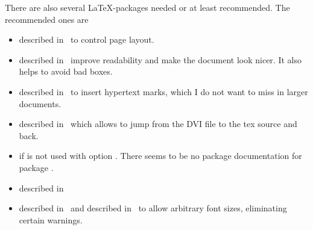 There are also several \LaTeX-packages needed or at least recommended. 
The recommended ones are 
%
\begin{itemize}
\item
{} described in~\cite{GeomP} 
to control page layout. 
\item
{} described in~\cite{MicroTyP} improve readability 
and make the document look nicer. 
It also helps to avoid bad boxes. 
\item
{} described in~\cite{HyperTextP} 
to insert hypertext marks, which I do not want to miss in larger documents. 
\item
{} described in~\cite{SrcLtxP} 
which allows to jump from the DVI file to the tex source and back.
\item
{} 
if  is not used with option . 
There seems to be no package documentation for package . 
\item
{} described in~\cite{BooktP} 

\item
{} described in~\cite{FixCmP} and 
 described in~\cite{AnyfontsizeP} 
to allow arbitrary font sizes, eliminating certain warnings. 
\end{itemize}

